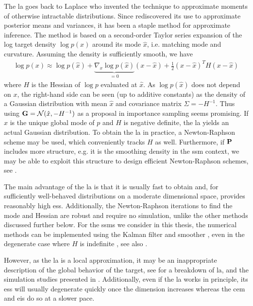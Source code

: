 The \acrfull{la} goes back to Laplace \citep{Laplace1986Memoir} who invented the technique to approximate moments of otherwise intractable distributions. Since \citep{Tierney1986Accurate,Tierney1989Fully} rediscovered its use to approximate posterior means and variances, it has been a staple method for approximate inference.
The method is based on a second-order Taylor series expansion of the log target density $\log p(x)$ around its mode $\hat x$, i.e. matching mode and curvature. Assuming the density is sufficiently smooth, we have
\begin{align}
    \label{eq:LA_approximation}
\log p(x) \approx \log p(\hat x) + \underbrace{\nabla_{x} \log p (\hat x)}_{= 0} \left( x - \hat x \right) + \frac{1}{2} (x - \hat x)^{T} H (x - \hat x)
\end{align}
where $H$ is the Hessian of $\log p$ evaluated at $\hat x$. As $\log p (\hat x)$ does not depend on $x$, the right-hand side can be seen (up to additive constants) as the density of a Gaussian distribution with mean $\hat x$ and covariance matrix $\Sigma = - H^{-1}$. Thus using $\G = \mathcal N (\hat x, -H^{-1})$ as a proposal in importance sampling seems promising. 
If $\hat x$ is the unique global mode of $p$ and $H$ is negative definite, the \gls{la} yields an actual Gaussian distribution. 
To obtain the \acrshort{la} in practice, a Newton-Raphson scheme may be used, which conveniently tracks $H$ as well. Furthermore, if $\P$ includes more structure, e.g. it is the smoothing density in the \acrshort{ssm} context, we may be able to exploit this structure to design efficient Newton-Raphson schemes, see .

The main advantage of the \gls{la} is that it is usually fast to obtain and, for sufficiently well-behaved distributions on a moderate dimensional space, provides reasonably high \gls{ess}. Additionally, the Newton-Raphson iterations to find the mode and Hessian are robust and require no simulation, unlike the other methods discussed further below.
For the \glspl{ssm} we consider in this thesis, the numerical methods can be implemented using the Kalman filter and smoother \citep{Shephard1997Likelihood,Durbin1997Monte}, even in the degenerate case where $H$ is indefinite \citep{Jungbacker2007Monte}, see also .

However, as the \gls{la} is a local approximation, it may be an inappropriate description of the global behavior of the target, see  for a breakdown of \gls{la}, and the simulation studies presented in . 
Additionally, even if the \gls{la} works in principle, its \gls{ess} will usually degenerate quickly once the dimension increases whereas the \gls{cem} and \gls{eis} do so at a slower pace.

%

